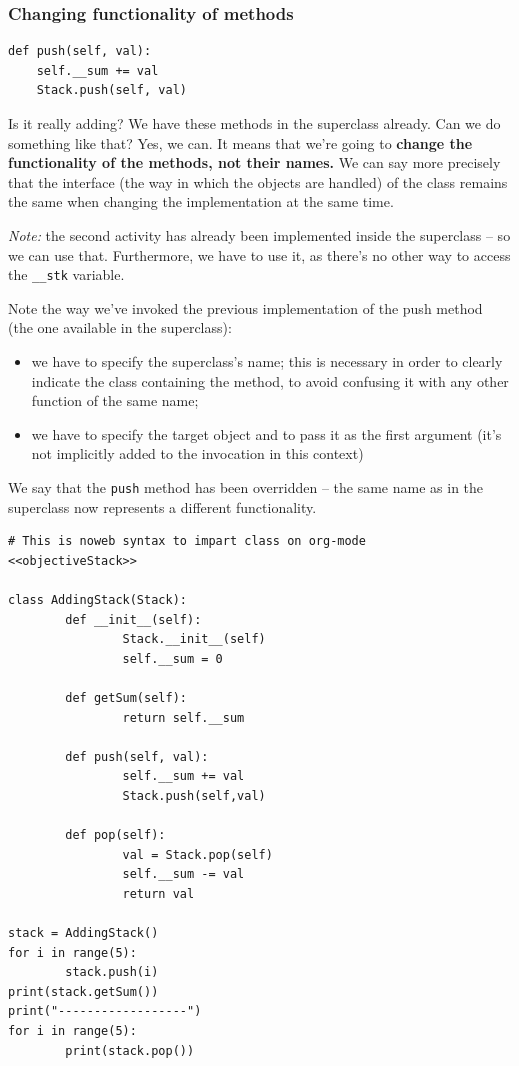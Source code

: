 \documentclass[11pt]{article}
\begin{document}
\subsubsection{Changing functionality of methods}
\label{sec:org42e906b}

\begin{verbatim}
def push(self, val):
    self.__sum += val
    Stack.push(self, val)
\end{verbatim}

Is it really adding? We have these methods in the superclass
already. Can we do something like that? Yes, we can. It means that
we’re going to \textbf{change the functionality of the methods, not their
names.} We can say more precisely that the interface (the way in which
the objects are handled) of the class remains the same when changing
the implementation at the same time.

\emph{Note:} the second activity has already been implemented inside the
superclass – so we can use that. Furthermore, we have to use it, as
there’s no other way to access the \texttt{\_\_stk} variable.

Note the way we’ve invoked the previous implementation of the push
method (the one available in the superclass):
\begin{itemize}
\item we have to specify the superclass’s name; this is necessary in order
to clearly indicate the class containing the method, to avoid
confusing it with any other function of the same name;
\item we have to specify the target object and to pass it as the first
argument (it’s not implicitly added to the invocation in this
context)
\end{itemize}

We say that the \texttt{push} method has been overridden – the same name as
in the superclass now represents a different functionality.

\begin{verbatim}
# This is noweb syntax to impart class on org-mode
<<objectiveStack>>

class AddingStack(Stack):
        def __init__(self):
                Stack.__init__(self)
                self.__sum = 0

        def getSum(self):
                return self.__sum

        def push(self, val):
                self.__sum += val
                Stack.push(self,val)

        def pop(self):
                val = Stack.pop(self)
                self.__sum -= val
                return val

stack = AddingStack()
for i in range(5):
        stack.push(i)
print(stack.getSum())
print("------------------")
for i in range(5):
        print(stack.pop())
\end{verbatim}
\end{document}
